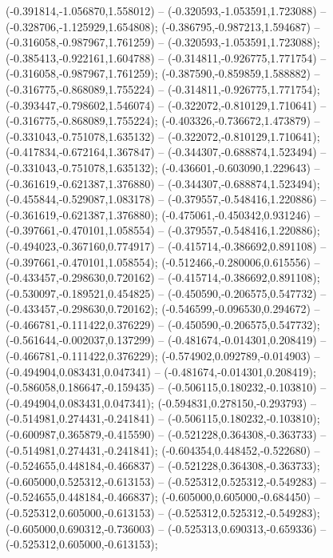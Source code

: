  (-0.391814,-1.056870,1.558012) -- (-0.320593,-1.053591,1.723088) -- (-0.328706,-1.125929,1.654808);
 (-0.386795,-0.987213,1.594687) -- (-0.316058,-0.987967,1.761259) -- (-0.320593,-1.053591,1.723088);
 (-0.385413,-0.922161,1.604788) -- (-0.314811,-0.926775,1.771754) -- (-0.316058,-0.987967,1.761259);
 (-0.387590,-0.859859,1.588882) -- (-0.316775,-0.868089,1.755224) -- (-0.314811,-0.926775,1.771754);
 (-0.393447,-0.798602,1.546074) -- (-0.322072,-0.810129,1.710641) -- (-0.316775,-0.868089,1.755224);
 (-0.403326,-0.736672,1.473879) -- (-0.331043,-0.751078,1.635132) -- (-0.322072,-0.810129,1.710641);
 (-0.417834,-0.672164,1.367847) -- (-0.344307,-0.688874,1.523494) -- (-0.331043,-0.751078,1.635132);
 (-0.436601,-0.603090,1.229643) -- (-0.361619,-0.621387,1.376880) -- (-0.344307,-0.688874,1.523494);
 (-0.455844,-0.529087,1.083178) -- (-0.379557,-0.548416,1.220886) -- (-0.361619,-0.621387,1.376880);
 (-0.475061,-0.450342,0.931246) -- (-0.397661,-0.470101,1.058554) -- (-0.379557,-0.548416,1.220886);
 (-0.494023,-0.367160,0.774917) -- (-0.415714,-0.386692,0.891108) -- (-0.397661,-0.470101,1.058554);
 (-0.512466,-0.280006,0.615556) -- (-0.433457,-0.298630,0.720162) -- (-0.415714,-0.386692,0.891108);
 (-0.530097,-0.189521,0.454825) -- (-0.450590,-0.206575,0.547732) -- (-0.433457,-0.298630,0.720162);
 (-0.546599,-0.096530,0.294672) -- (-0.466781,-0.111422,0.376229) -- (-0.450590,-0.206575,0.547732);
 (-0.561644,-0.002037,0.137299) -- (-0.481674,-0.014301,0.208419) -- (-0.466781,-0.111422,0.376229);
 (-0.574902,0.092789,-0.014903) -- (-0.494904,0.083431,0.047341) -- (-0.481674,-0.014301,0.208419);
 (-0.586058,0.186647,-0.159435) -- (-0.506115,0.180232,-0.103810) -- (-0.494904,0.083431,0.047341);
 (-0.594831,0.278150,-0.293793) -- (-0.514981,0.274431,-0.241841) -- (-0.506115,0.180232,-0.103810);
 (-0.600987,0.365879,-0.415590) -- (-0.521228,0.364308,-0.363733) -- (-0.514981,0.274431,-0.241841);
 (-0.604354,0.448452,-0.522680) -- (-0.524655,0.448184,-0.466837) -- (-0.521228,0.364308,-0.363733);
 (-0.605000,0.525312,-0.613153) -- (-0.525312,0.525312,-0.549283) -- (-0.524655,0.448184,-0.466837);
 (-0.605000,0.605000,-0.684450) -- (-0.525312,0.605000,-0.613153) -- (-0.525312,0.525312,-0.549283);
 (-0.605000,0.690312,-0.736003) -- (-0.525313,0.690313,-0.659336) -- (-0.525312,0.605000,-0.613153);

